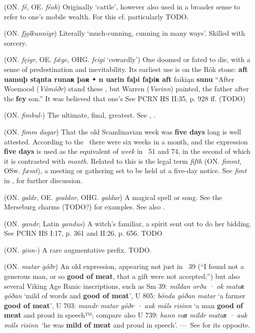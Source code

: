 \begin{itemize}
 (ON. \emph{fé}, OE. \emph{féoh})
  Originally ‘cattle’, however also used in a broader sense to refer to one’s mobile wealth. For this cf. particularly \Havamal TODO.

 (ON. \emph{fjǫlkunnigr})
  Literally ‘much-cunning, cunning in many ways’. Skilled with sorcery.

 (ON. \emph{fęigr}, OE. \emph{fǽge}, OHG. \emph{feigi} ‘cowardly’)
  One doomed or fated to die, with a sense of predestination and inevitability. Its earliest use is on the Rök stone: \textbf{aft uamuþ stąnta runaʀ þaʀ ᛭ n uarin faþi faþiʀ aft} faikiąn \textbf{sunu} “After Woemood (\emph{Vámóðr}) stand these , but Warren (\emph{Varinn}) painted, the father after the \textbf{fey} son.” It was believed that one’s See PCRN HS II:35, p. 928 ff. (TODO)

 (ON. \emph{fimbul-})
  The ultimate, final, greatest. See , .

 (ON. \emph{fimm dagar})
  That the old Scandinavian week was \textbf{five days} long is well attested. According to the \Gulatingslog\ there were six weeks in a month, and the expression \textbf{five days} is used as the equivalent of \emph{week} in \Havamal\ 51 and 74, in the second of which it is contrasted with \emph{month}. Related to this is the legal term \emph{fifth} (ON. \emph{fimmt}, OSw. \emph{fæmt}), a meeting or gathering set to be held at a five-day notice. See \emph{fimt} in \CV, \textcite{LMNL} for further discussion.

 (ON. \emph{galdr}, OE. \emph{gealdor}, OHG. \emph{galdar})
  A magical spell or song. See the Merseburg charms (TODO?) for examples. See also .

 (ON. \emph{gandr}, Latin \emph{gandus})
  A witch’s familiar, a spirit sent out to do her bidding. See PCRN HS I:17, p. 361 and II:26, p. 656. TODO

 (ON. \emph{ginn-})
  A rare augmentative prefix. TODO.

 (ON. \emph{matar góðr})
   An old expression, appearing not just in \Havamal\ 39 (“I found not a generous man, or so \textbf{good of meat}, that a gift were not accepted;”) but also several Viking Age Runic inscriptions, such as Sm 39: \emph{mildan orða · ok mataʀ góðan} ‘mild of words and \textbf{good of meat}’, U 805: \emph{bónda góðan matar} ‘a farmer \textbf{good of meat}’, U 703: \emph{mandr matar góðr · auk máls risinn} ‘a man \textbf{good of meat} and proud in speech™; compare also U 739: \emph{hann vaʀ mildr mataʀ · auk máls risinn} ‘he was \textbf{mild of meat} and proud in speech’. — See  for its opposite.


\end{itemize}
